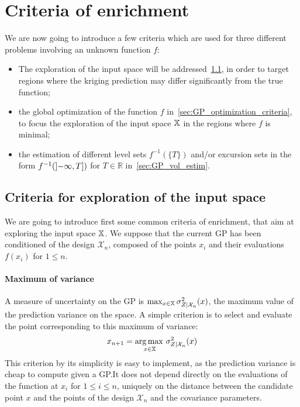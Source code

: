 \documentclass[../../Main_ManuscritThese.tex]{subfiles}
\begin{document}
\section{Criteria of enrichment}

We are now going to introduce a few criteria which are used for three
different problems involving an unknown function $f$:
\begin{itemize}
\item The exploration of the input space will be
  addressed~\cref{sec:exploration_criteria}, in order to target
  regions where the kriging prediction may differ significantly from
  the true function;
\item the global optimization of the function $f$
  in~\cref{sec:GP_optimization_criteria}, to focus the exploration of
  the input space $\mathbb{X}$ in the regions where $f$ is minimal;
\item the estimation of different level sets $f^{-1}(\{T\})$ and/or
  excursion sets in the form
  $f^{-1}(\interval[open left]{-\infty}{T})$ for $T\in\mathbb{R}$
  in~\cref{sec:GP_vol_estim}.
\end{itemize}

\subsection{Criteria for exploration of the input space}
\label{sec:exploration_criteria}
We are going to introduce first some common criteria of enrichment,
that aim at exploring the input space $\mathbb{X}$.  We suppose that the
current GP has been conditioned of the design $\mathcal{X}_n$,
composed of the points $x_i$ and their evaluations $f(x_i)$ for
$1\leq n$.

\paragraph{Maximum of variance}
A measure of uncertainty on the GP is
$\max_{x\in\mathbb{X}} \sigma_{Z \mid \mathcal{X}_n}^2(x)$, the maximum
value of the prediction variance on the space. A simple criterion is
to select and evaluate the point corresponding to this maximum of
variance:
\begin{equation}
  x_{n+1} = \operatorname*{arg\,max \,}_{x \in \mathbb{X}} \sigma^2_{Z \mid \mathcal{X}_n}(x)
\end{equation}
This criterion by its simplicity is easy to implement, as the
prediction variance is cheap to compute given a GP.\@ It does not
depend directly on the evaluations of the function at $x_i$ for
$1\leq i\leq n$, uniquely on the distance between the candidate point
$x$ and the points of the design $\mathcal{X}_n$ and the covariance
parameters.
\end{document}
